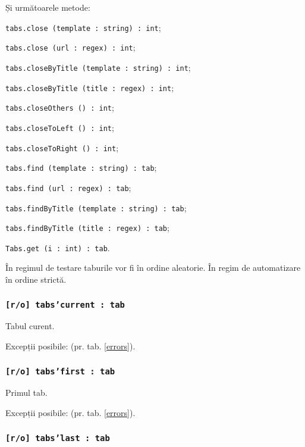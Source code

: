 Și următoarele metode:
\begin{icItems}
	\item \texttt{tabs.close (template : string) : int};
	\item \texttt{tabs.close (url : regex) : int};
	\item \texttt{tabs.closeByTitle (template : string) : int};
	\item \texttt{tabs.closeByTitle (title : regex) : int};
	\item \texttt{tabs.closeOthers () : int};
	\item \texttt{tabs.closeToLeft () : int};
	\item \texttt{tabs.closeToRight () : int};
	\item \texttt{tabs.find (template : string) : tab};
	\item \texttt{tabs.find (url : regex) : tab};
	\item \texttt{tabs.findByTitle (template : string) : tab};
	\item \texttt{tabs.findByTitle (title : regex) : tab};
	\item \texttt{Tabs.get (i : int) : tab}.
\end{icItems}

În regimul de testare taburile vor fi în ordine aleatorie. În regim de automatizare în ordine strictă.

\subsubsection{\texttt{[r/o] tabs'current : tab}}

Tabul curent.

Excepții posibile:  (pr. tab. \ref{errors}).

\subsubsection{\texttt{[r/o] tabs'first : tab}}

Primul tab.

Excepții posibile:  (pr. tab. \ref{errors}).

\subsubsection{\texttt{[r/o] tabs'last : tab}}

